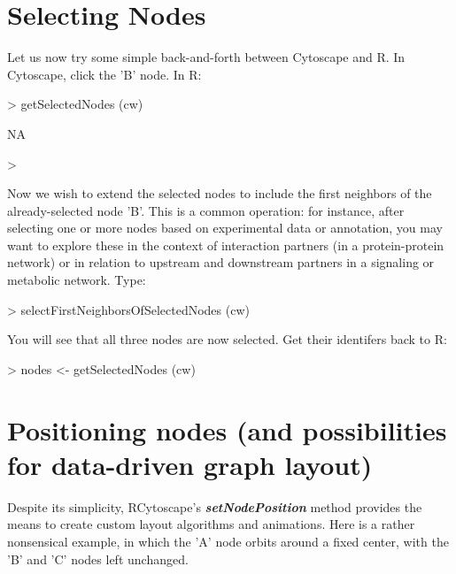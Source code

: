 \documentclass[12pt]{article}
\begin{document}
\section{Selecting Nodes}

Let us now try some simple back-and-forth between Cytoscape and R.  In Cytoscape, click the 'B' node.  In R:

\begin{Schunk}
\begin{Sinput}
>   getSelectedNodes (cw)
\end{Sinput}
\begin{Soutput}
[1] NA
\end{Soutput}
\begin{Sinput}
>     
\end{Sinput}
\end{Schunk}

Now we wish to extend the selected nodes to include the first neighbors of the already-selected node 'B'.  This is a common operation: for instance, after selecting one or more nodes based on experimental data or annotation, you may want to explore these in the context of interaction partners (in a protein-protein network) or in relation to upstream and downstream partners in a signaling or metabolic network.  Type:

\begin{Schunk}
\begin{Sinput}
>   selectFirstNeighborsOfSelectedNodes (cw)
\end{Sinput}
\end{Schunk}

You will see that all three nodes are now selected.  Get their identifers back to R:

\begin{Schunk}
\begin{Sinput}
>   nodes <- getSelectedNodes (cw)
\end{Sinput}
\end{Schunk}


\section{Positioning nodes (and possibilities for data-driven graph layout)}

Despite its simplicity, RCytoscape's \emph{\textbf{setNodePosition}} method provides the means to create custom layout algorithms and animations.  Here is a rather nonsensical example, in which the 'A' node orbits around a fixed center, with the 'B' and 'C' nodes left unchanged.
\end{document}
